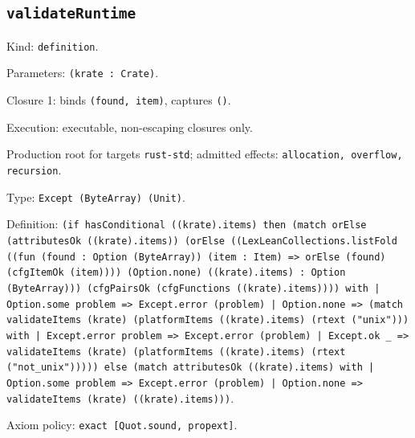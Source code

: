 \documentclass[11pt]{article}
\begin{document}
\subsection*{\texttt{validateRuntime}}
\noindent Kind: \texttt{definition}.\par
\noindent Parameters: \texttt{(krate : Crate)}.\par
\noindent Closure 1: binds \texttt{(found, item)}, captures \texttt{()}.\par
\noindent Execution: executable, non-escaping closures only.\par
\noindent Production root for targets \texttt{rust-std}; admitted effects: \texttt{allocation, overflow, recursion}.\par
\noindent Type: \texttt{Except (ByteArray) (Unit)}.\par
\noindent Definition: \texttt{(if hasConditional ((krate).items) then (match orElse (attributesOk ((krate).items)) (orElse ((LexLeanCollections.listFold ((fun (found : Option (ByteArray)) (item : Item) => orElse (found) (cfgItemOk (item)))) (Option.none) ((krate).items) : Option (ByteArray))) (cfgPairsOk (cfgFunctions ((krate).items)))) with | Option.some problem => Except.error (problem) | Option.none => (match validateItems (krate) (platformItems ((krate).items) (rtext ("unix"))) with | Except.error problem => Except.error (problem) | Except.ok \_ => validateItems (krate) (platformItems ((krate).items) (rtext ("not\_unix"))))) else (match attributesOk ((krate).items) with | Option.some problem => Except.error (problem) | Option.none => validateItems (krate) ((krate).items)))}.\par
\noindent Axiom policy: \texttt{exact [Quot.sound, propext]}.\par
\end{document}
